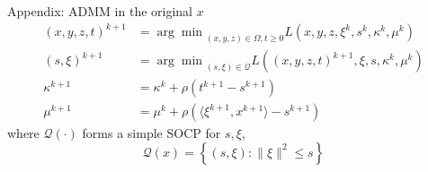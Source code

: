 \documentclass[aspectratio=1610, 9pt]{beamer}
\newcommand{\red}[1]{\textcolor{red}{#1}}
\begin{document}
\begin{frame}[allowframebreaks]{\hypertarget{oldad}{Appendix: ADMM in the original \(x\)}}
  \begin{align*}
    (x,y,z,t)^{k+1} & = {\arg\min}_{(x,y,z)\in\Omega, t\ge 0} L\left(x,y,z,\xi^k,s^k,\kappa^k,\mu^k\right)       \\
    (s, \xi)^{k+1}  & = {\arg\min}_{(s, \xi)\in\mathscr{Q}} L\left((x,y,z,t)^{k+1},\xi,s, \kappa^k, \mu^k\right) \\
    \kappa^{k+1}    & = \kappa^k + \rho\left(t^{k+1}-s^{k+1}\right)                                              \\
    \mu^{k+1}       & = \mu^k + \rho\left( \langle\xi^{k+1}, x^{k+1}\rangle - s^{k+1}\right)
  \end{align*}
  where \(\mathscr{Q(\cdot)}\) forms a simple SOCP for \(s, \xi\),
  \begin{equation}
    \mathscr{Q}(x) =\left\{(s,\xi): \|\xi\|^2 \le s\right\}
  \end{equation}

\end{frame}





\end{document}
